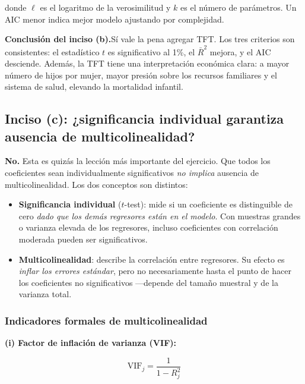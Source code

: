 \documentclass[12pt, letterpaper]{article}
\begin{document}
\noindent donde $\ell$ es el logaritmo de la verosimilitud y $k$ es el número de
parámetros. Un AIC menor indica mejor modelo ajustando por complejidad.

\medskip
\noindent\textbf{Conclusión del inciso (b).}\quad Sí vale la pena agregar TFT.
Los tres criterios son consistentes: el estadístico $t$ es significativo al 1\%,
el $\bar{R}^2$ mejora, y el AIC desciende. Además, la TFT tiene una interpretación
económica clara: a mayor número de hijos por mujer, mayor presión sobre los recursos
familiares y el sistema de salud, elevando la mortalidad infantil.

\subsection{Inciso (c): ¿significancia individual garantiza ausencia de multicolinealidad?}

\textbf{No.} Esta es quizás la lección más importante del ejercicio. Que todos los
coeficientes sean individualmente significativos \emph{no implica} ausencia de
multicolinealidad. Los dos conceptos son distintos:

\begin{itemize}[leftmargin=1.6em, itemsep=4pt]
  \item \textbf{Significancia individual} ($t$-test): mide si un coeficiente es
    distinguible de cero \emph{dado que los demás regresores están en el modelo}.
    Con muestras grandes o varianza elevada de los regresores, incluso coeficientes
    con correlación moderada pueden ser significativos.

  \item \textbf{Multicolinealidad}: describe la correlación entre regresores. Su
    efecto es \emph{inflar los errores estándar}, pero no necesariamente hasta el
    punto de hacer los coeficientes no significativos —depende del tamaño muestral
    y de la varianza total.
\end{itemize}

\subsubsection{Indicadores formales de multicolinealidad}

\noindent\textbf{(i) Factor de inflación de varianza (VIF):}

\begin{equation}
  \text{VIF}_j = \frac{1}{1 - R_j^2}
  \label{eq:VIF}
\end{equation}
\end{document}
